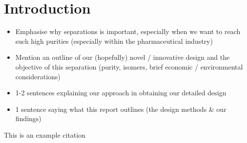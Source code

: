 

\section{Introduction}
\label{sec:introduction}

\begin{itemize}
    \item Emphasise why separations is important, especially when we want to reach such high purities (especially within the pharmaceutical industry)
    \item Mention an outline of our (hopefully) novel / innovative design and the objective of this separation (purity, isomers, brief economic / environmental considerations)
    \item 1-2 sentences explaining our approach in obtaining our detailed design 
    \item 1 sentence saying what this report outlines (the design methods & our findings)
\end{itemize}




This is an example citation \cite{Caliman}
